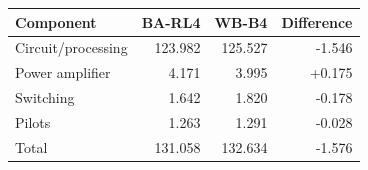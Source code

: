 \begin{tabular}{@{}lrrr@{}}
\toprule
Component & BA-RL4 & WB-B4 & Difference\\
\midrule
Circuit/processing & 123.982 & 125.527 & -1.546\\
Power amplifier & 4.171 & 3.995 & +0.175\\
Switching & 1.642 & 1.820 & -0.178\\
Pilots & 1.263 & 1.291 & -0.028\\
Total & 131.058 & 132.634 & -1.576\\
\bottomrule
\end{tabular}
